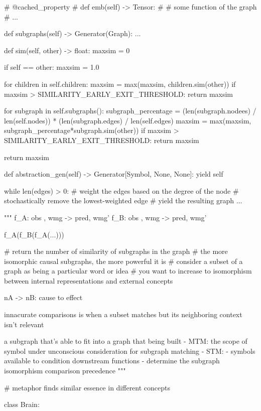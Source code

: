     # @cached_property
    # def emb(self) -> Tensor:
    #     # some function of the graph
    #     ...

    def subgraphs(self) -> Generator(Graph):
        ...

    def sim(self, other) -> float:
        maxsim = 0

        if self == other:
            maxsim = 1.0

        for children in self.children:
            maxsim = max(maxsim, children.sim(other))
            if maxsim > SIMILARITY_EARLY_EXIT_THRESHOLD:
                return maxsim

        for subgraph in self.subgraphs():
            subgraph_percentage = (len(subgraph.nodees) / len(self.nodes)) * (len(subgraph.edges) / len(self.edges)
            maxsim = max(maxsim, subgraph_percentage*subgraph.sim(other))
            if maxsim > SIMILARITY_EARLY_EXIT_THRESHOLD:
                return maxsim

        return maxsim

    def abstraction_gen(self) -> Generator[Symbol, None, None]:
        yield self

        while len(edges) > 0:
            # weight the edges based on the degree of the node
            # stochastically remove the lowest-weighted edge
            # yield the resulting graph
            ...

"""
f_A: obs , wmg -> pred, wmg'
f_B: obs , wmg -> pred, wmg'

f_A(f_B(f_A(...)))


# return the number of similarity of subgraphs in the graph
# the more isomorphic causal subgraphs, the more powerful it is
# consider a subset of a graph as being a particular word or idea
# you want to increase to isomorphism between internal representations and external concepts

nA -> nB: cause to effect

innacurate comparisons is when a subset matches but its neighboring context isn't relevant

a subgraph that's able to fit into a graph that being built
- MTM: the scope of symbol under unconscious consideration for subgraph matching
- STM:
    - symbols available to condition downstream functions
    - determine the subgraph isomorphism comparison precedence
"""

# metaphor finds similar essence in different concepts

class Brain:

